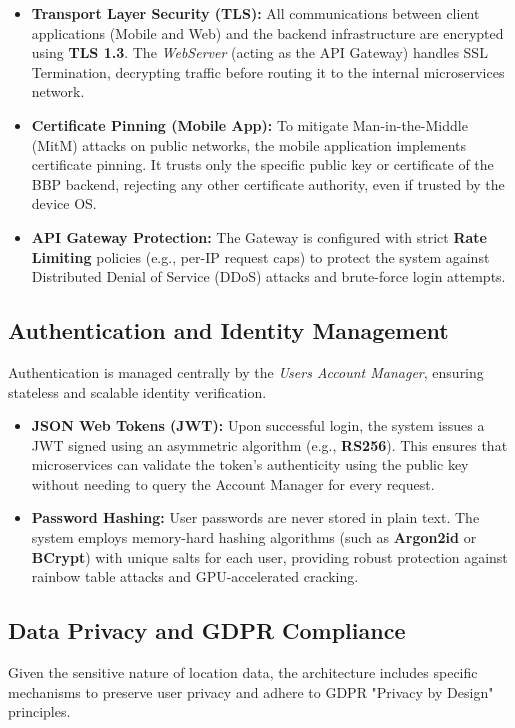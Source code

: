 \begin{itemize}
    \item \textbf{Transport Layer Security (TLS):} All communications between client applications (Mobile and Web) and the backend infrastructure are encrypted using \textbf{TLS 1.3}. The \textit{WebServer} (acting as the API Gateway) handles SSL Termination, decrypting traffic before routing it to the internal microservices network.
    \item \textbf{Certificate Pinning (Mobile App):} To mitigate Man-in-the-Middle (MitM) attacks on public networks, the mobile application implements certificate pinning. It trusts only the specific public key or certificate of the BBP backend, rejecting any other certificate authority, even if trusted by the device OS.
    \item \textbf{API Gateway Protection:} The Gateway is configured with strict \textbf{Rate Limiting} policies (e.g., per-IP request caps) to protect the system against Distributed Denial of Service (DDoS) attacks and brute-force login attempts.
\end{itemize}

\subsection{Authentication and Identity Management}
Authentication is managed centrally by the \textit{Users Account Manager}, ensuring stateless and scalable identity verification.

\begin{itemize}
    \item \textbf{JSON Web Tokens (JWT):} Upon successful login, the system issues a JWT signed using an asymmetric algorithm (e.g., \textbf{RS256}). This ensures that microservices can validate the token's authenticity using the public key without needing to query the Account Manager for every request.
    \item \textbf{Password Hashing:} User passwords are never stored in plain text. The system employs memory-hard hashing algorithms (such as \textbf{Argon2id} or \textbf{BCrypt}) with unique salts for each user, providing robust protection against rainbow table attacks and GPU-accelerated cracking.
\end{itemize}

\subsection{Data Privacy and GDPR Compliance}
Given the sensitive nature of location data, the architecture includes specific mechanisms to preserve user privacy and adhere to GDPR "Privacy by Design" principles.

